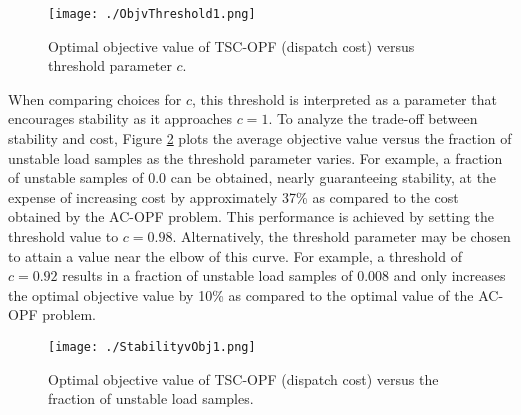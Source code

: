 \documentclass[lettersize,journal]{IEEEtran}
\begin{document}
\begin{figure}[h!]
    \centering
    \texttt{[image: ./ObjvThreshold1.png]}
    \caption{Optimal objective value of TSC-OPF (dispatch cost) versus threshold parameter $c$.}
    \label{fig:ObjvThreshold}
\end{figure}


When comparing choices for $c$, this threshold is interpreted as a parameter that encourages stability as it approaches $c=1$.  To analyze the trade-off between stability and cost, Figure \ref{fig:ObjvStability1} plots the average objective value versus the fraction of unstable load samples as the threshold parameter varies. For example, a fraction of unstable samples of 0.0 can be obtained, nearly guaranteeing stability, at the expense of increasing cost by approximately 37\% as compared to the cost obtained by the AC-OPF problem.  This performance is achieved by setting the threshold value to $c=0.98$.  Alternatively, the threshold parameter may be chosen to attain a value near the elbow of this curve.  For example, a threshold of $c=0.92$ results in a fraction of unstable load samples of $0.008$ and only increases the optimal objective value by 10\% as compared to the optimal value of the AC-OPF problem. %


\begin{figure}[h!]
    \centering
    \texttt{[image: ./StabilityvObj1.png]}
    \caption{
    \label{fig:ObjvStability1}Optimal objective value of TSC-OPF (dispatch cost) versus the fraction of unstable load samples.}
\end{figure}
\end{document}
